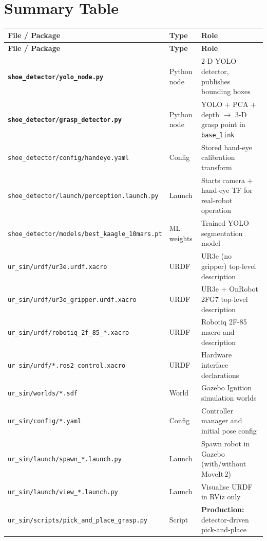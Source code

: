 \documentclass[11pt,a4paper]{article}
\newcommand{\pkg}[1]{\texttt{\textbf{#1}}}
\newcommand{\file}[1]{\texttt{#1}}
\begin{document}
\section{Summary Table}

\begin{longtable}{|p{5cm}|p{2.5cm}|p{7cm}|}
\hline
\textbf{File / Package} & \textbf{Type} & \textbf{Role} \\
\hline
\endfirsthead
\hline
\textbf{File / Package} & \textbf{Type} & \textbf{Role} \\
\hline
\endhead
\hline
\endfoot
\hline
\endlastfoot

\pkg{shoe\_detector/yolo\_node.py} & Python node & 2-D YOLO detector, publishes bounding boxes \\
\hline
\pkg{shoe\_detector/grasp\_detector.py} & Python node & YOLO + PCA + depth $\to$ 3-D grasp point in \texttt{base\_link} \\
\hline
\file{shoe\_detector/config/handeye.yaml} & Config & Stored hand-eye calibration transform \\
\hline
\file{shoe\_detector/launch/perception.launch.py} & Launch & Starts camera + hand-eye TF for real-robot operation \\
\hline
\file{shoe\_detector/models/best\_kaagle\_10mars.pt} & ML weights & Trained YOLO segmentation model \\
\hline
\file{ur\_sim/urdf/ur3e.urdf.xacro} & URDF & UR3e (no gripper) top-level description \\
\hline
\file{ur\_sim/urdf/ur3e\_gripper.urdf.xacro} & URDF & UR3e + OnRobot 2FG7 top-level description \\
\hline
\file{ur\_sim/urdf/robotiq\_2f\_85\_*.xacro} & URDF & Robotiq 2F-85 macro and description \\
\hline
\file{ur\_sim/urdf/*.ros2\_control.xacro} & URDF & Hardware interface declarations \\
\hline
\file{ur\_sim/worlds/*.sdf} & World & Gazebo Ignition simulation worlds \\
\hline
\file{ur\_sim/config/*.yaml} & Config & Controller manager and initial pose config \\
\hline
\file{ur\_sim/launch/spawn\_*.launch.py} & Launch & Spawn robot in Gazebo (with/without MoveIt\,2) \\
\hline
\file{ur\_sim/launch/view\_*.launch.py} & Launch & Visualise URDF in RViz only \\
\hline
\file{ur\_sim/scripts/pick\_and\_place\_grasp.py} & Script & \textbf{Production:} detector-driven pick-and-place \\

\end{longtable}
\end{document}
